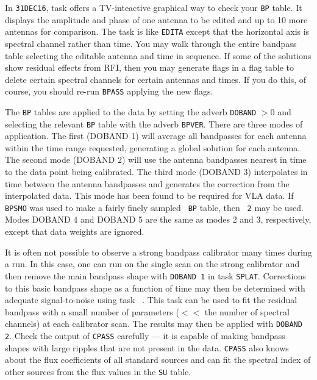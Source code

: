      In {\tt 31DEC16}, task {\tt {}} offers a TV-inteactive
graphical way to check your {\tt BP} table.  It displays the amplitude
and phase of one antenna to be edited and up to 10 more antennas for
comparison.  The task is like {\tt EDITA} except that the horizontal
axis is spectral channel rather than time.  You may walk through the
entire bandpass table selecting the editable antenna and time in
sequence.  If some of the solutions show residual effects from RFI,
then you may generate flags in a flag table to delete certain spectral
channels for certain antennas and times.  If you do this, of course,
you should re-run {\tt BPASS} applying the new flags.

     The {\tt BP} tables are applied to the data by setting the adverb
{\tt DOBAND} $> 0$ and selecting the relevant {\tt BP} table with the
adverb \hbox{{\tt BPVER}}.  There are three modes of 
application.  The first ({\us DOBAND 1}) will average all bandpasses
for each antenna within the time range requested, generating a global
solution for each antenna.  The second mode ({\us DOBAND 2}) will use
the antenna bandpasses nearest in time to the data point being
calibrated.  The third mode ({\us DOBAND 3}) interpolates in time
between the antenna bandpasses and generates the correction from the
interpolated data.  This mode has been found to be required for VLA
data.  If {\tt BPSMO} was used to make a fairly finely sampled {\tt
BP} table, then {\tt {} 2} may be used.  Modes {\us DOBAND
4} and {\us DOBAND 5} are the same as modes 2 and 3, respectively,
except that data weights are ignored.

     It is often not possible to observe a strong bandpass calibrator
many times during a run.  In this case, one can run {\tt {}}
on the single scan on the strong calibrator and then remove the main
bandpass shape with {\tt DOBAND 1} in task {\tt SPLAT}\@.  Corrections
to this basic bandpass shape as a function of time may then be
determined with adequate signal-to-noise using task {\tt
{}}\@.  This task can be used to fit the residual bandpass
with a small number of parameters ($<<$ the number of spectral
channels) at each calibrator scan.  The results may then be applied
with {\tt DOBAND 2}\@.  Check the output of {\tt CPASS} carefully ---
it is capable of making bandpass shapes with large ripples that are
not present in the data.  {\tt CPASS} also knows about the flux
coefficients of all standard sources and can fit the spectral index of
other sources from the flux values in the {\tt SU} table.


